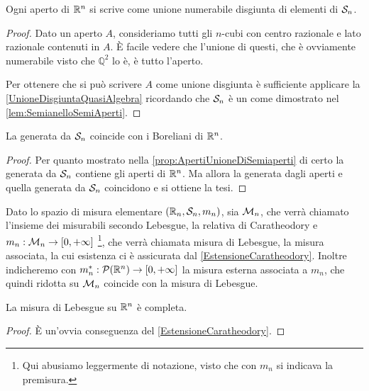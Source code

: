 \begin{proposition}\label{prop:ApertiUnioneDiSemiaperti}
	Ogni aperto di $\R^n$ si scrive come unione numerabile disgiunta di elementi di $\S_n$.
\end{proposition}
\begin{proof}
	Dato un aperto $A$, consideriamo tutti gli $n$-cubi con centro razionale e lato razionale contenuti in $A$.
	È facile vedere che l'unione di questi, che è ovviamente numerabile visto che $\mathbb Q^2$ lo è, è tutto l'aperto.
	
	Per ottenere che si può scrivere $A$ come unione disgiunta è sufficiente applicare la \cref{UnioneDisgiuntaQuasiAlgebra} ricordando che $\S_n$ è un \semiring{} come dimostrato nel \cref{lem:SemianelloSemiAperti}.
\end{proof}

\begin{proposition}\label{SigAlgUgualeBoreliani}
	La \sigalg{} generata da $\S_n$ coincide con i Boreliani di $\R^n$.
\end{proposition}
\begin{proof}
	Per quanto mostrato nella \cref{prop:ApertiUnioneDiSemiaperti} di certo la \sigalg{} generata da $\S_n$ contiene gli aperti di $\R^n$.
	Ma allora la \sigalg{} generata dagli aperti e quella generata da $\S_n$ coincidono e si ottiene la tesi.
\end{proof}

\begin{definition}\label{LebesgueMisura}
	Dato lo spazio di misura elementare $(\R_n,\S_n,m_n)$, sia $\M_n$, che verrà chiamato l'insieme dei misurabili secondo Lebesgue, la relativa \sigalg{} di Caratheodory e $m_n:\M_n\to\Rpiu$ \footnote{Qui abusiamo leggermente di notazione, visto che con $m_n$ si indicava la premisura.}, che verrà chiamata misura di Lebesgue, la misura associata, la cui esistenza ci è assicurata dal \cref{EstensioneCaratheodory}. 
	Inoltre indicheremo con $m_n^*:\mathcal P(\R^n)\to\Rpiu$ la misura esterna associata a $m_n$, che quindi ridotta su $\M_n$ coincide con la misura di Lebesgue.
\end{definition}

\begin{remark}\label{nota:LebesgueCompletezza}
	La misura di Lebesgue su $\R^n$ è completa.
\end{remark}
\begin{proof}
	È un'ovvia conseguenza del \cref{EstensioneCaratheodory}.
\end{proof}

